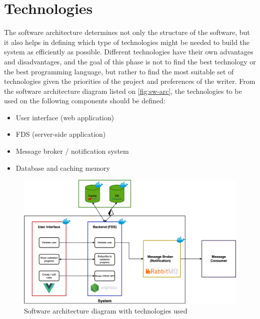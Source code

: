 \section{Technologies}

The software architecture determines not only the structure of the software, but it also helps in defining which type of technologies might be needed to build the system as efficiently as possible. Different technologies have their own advantages and disadvantages, and the goal of this phase is not to find the best technology or the best programming language, but rather to find the most suitable set of technologies given the priorities of the project and preferences of the writer.
From the software architecture diagram listed on \autoref{fig:sw-arc}, the technologies to be used on the following components should be defined:
\begin{itemize}
 \item User interface (web application)
 \item FDS (server-side application)
 \item Message broker / notification system 
 \item Database and caching memory
\end{itemize}

\begin{figure}[h]
 \includegraphics[width=\textwidth]{diagrams/architecture.png}
 \caption{Software architecture diagram with technologies used}
 \label{fig:sw-arc-tech}
\end{figure}

